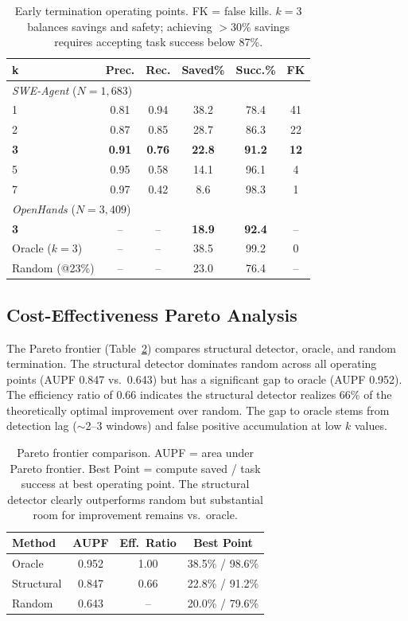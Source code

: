 \documentclass[11pt,a4paper]{article}
\begin{document}
\begin{table}[t]
\centering
\small
\begin{tabular}{lccccc}
\toprule
\textbf{k} & \textbf{Prec.} & \textbf{Rec.} & \textbf{Saved\%} & \textbf{Succ.\%} & \textbf{FK} \\
\midrule
\multicolumn{6}{l}{\emph{SWE-Agent} ($N{=}1{,}683$)} \\
1 & 0.81 & 0.94 & 38.2 & 78.4 & 41 \\
2 & 0.87 & 0.85 & 28.7 & 86.3 & 22 \\
\textbf{3} & \textbf{0.91} & \textbf{0.76} & \textbf{22.8} & \textbf{91.2} & \textbf{12} \\
5 & 0.95 & 0.58 & 14.1 & 96.1 & 4 \\
7 & 0.97 & 0.42 & 8.6 & 98.3 & 1 \\
\midrule
\multicolumn{6}{l}{\emph{OpenHands} ($N{=}3{,}409$)} \\
\textbf{3} & -- & -- & \textbf{18.9} & \textbf{92.4} & -- \\
\midrule
Oracle ($k{=}3$) & -- & -- & 38.5 & 99.2 & 0 \\
Random (@23\%) & -- & -- & 23.0 & 76.4 & -- \\
\bottomrule
\end{tabular}
\caption{Early termination operating points. FK = false kills. $k{=}3$ balances savings and safety; achieving ${>}$30\% savings requires accepting task success below 87\%.}
\label{tab:early_term}
\end{table}

\subsection{Cost-Effectiveness Pareto Analysis}

The Pareto frontier (Table~\ref{tab:pareto}) compares structural detector, oracle, and random termination.
The structural detector dominates random across all operating points (AUPF 0.847 vs.\ 0.643) but has a significant gap to oracle (AUPF 0.952).
The efficiency ratio of 0.66 indicates the structural detector realizes 66\% of the theoretically optimal improvement over random.
The gap to oracle stems from detection lag (${\sim}$2--3 windows) and false positive accumulation at low $k$ values.

\begin{table}[t]
\centering
\small
\begin{tabular}{lccc}
\toprule
\textbf{Method} & \textbf{AUPF} & \textbf{Eff.\ Ratio} & \textbf{Best Point} \\
\midrule
Oracle & 0.952 & 1.00 & 38.5\% / 98.6\% \\
Structural & 0.847 & 0.66 & 22.8\% / 91.2\% \\
Random & 0.643 & -- & 20.0\% / 79.6\% \\
\bottomrule
\end{tabular}
\caption{Pareto frontier comparison. AUPF = area under Pareto frontier. Best Point = compute saved / task success at best operating point. The structural detector clearly outperforms random but substantial room for improvement remains vs.\ oracle.}
\label{tab:pareto}
\end{table}
\end{document}
